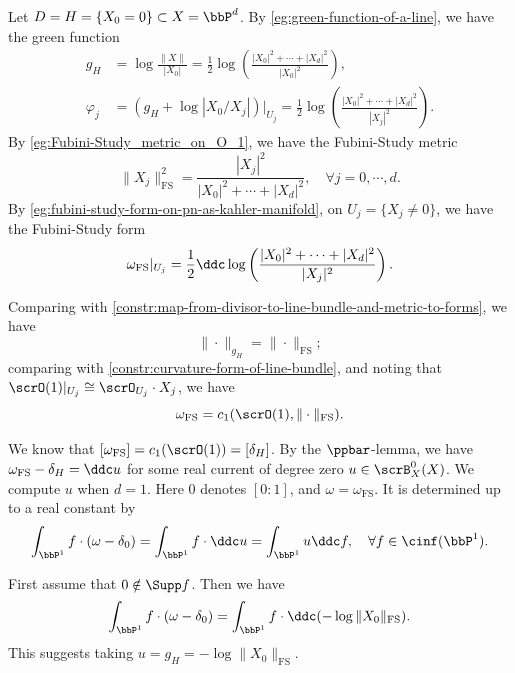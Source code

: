 \begin{example}[label=\labelNFM{eg:green-divisor-and-forms-of-line-in-pn}, status=draft, tag=0000000]
  Let $D = H = \{X_0 = 0\} \subset X = \bbP^d$.
  By \cref{eg:green-function-of-a-line}, we have the green function
  \begin{align*}
    g_H & = \log \frac{\|X\|}{|X_0|} = \frac{1}{2} \log \left( \frac{|X_0|^2 + \cdots + |X_d|^2}{|X_0|^2} \right), \\
    \varphi_j & = (g_H + \log |X_0/X_j|)|_{U_j} = \frac{1}{2} \log \left( \frac{|X_0|^2 + \cdots + |X_d|^2}{|X_j|^2} \right).
  \end{align*}
  By \cref{eg:Fubini-Study_metric_on_O_1}, we have the Fubini-Study metric
  \[ \|X_j\|_{\mathrm{FS}}^2 = \frac{|X_j|^2}{|X_0|^2 + \cdots + |X_d|^2}, \quad \forall j = 0,\cdots,d. \]
  By \cref{eg:fubini-study-form-on-pn-as-kahler-manifold}, on $U_j = \{X_j \neq 0\}$,
  we have the Fubini-Study form
  \[ \omega_{\mathrm{FS}}|_{U_j} = \frac{1}{2} \ddc \log \left(\frac{|X_0|^2 + \cdots + |X_d|^2}{|X_j|^2} \right). \]

  Comparing with \cref{constr:map-from-divisor-to-line-bundle-and-metric-to-forms}, we have
  \[ \|\cdot\|_{g_H} = \|\cdot\|_{\mathrm{FS}}; \]
  comparing with \cref{constr:curvature-form-of-line-bundle},
  and noting that $\scrO(1)|_{U_j} \cong \scrO_{U_j} \cdot X_j$, we have
  \[ \omega_{\mathrm{FS}} = c_1(\scrO(1), \|\cdot\|_{\mathrm{FS}}). \]

  We know that $[\omega_{\mathrm{FS}}] = c_1(\scrO(1)) = [\delta_H]$.
  By the $\ppbar$-lemma, we have $\omega_{\mathrm{FS}} - \delta_H = \ddc u$ for some real current of degree zero $u \in \scrB_X^0(X)$.
  We compute $u$ when $d = 1$.
  Here $0$ denotes $[0:1]$, and $\omega = \omega_{\mathrm{FS}}$.
  It is determined up to a real constant by
  \[ \int_{\bbP^1} f \cdot (\omega - \delta_0) = \int_{\bbP^1} f \cdot \ddc u = \int_{\bbP^1} u \ddc f, \quad \forall f \in \cinf(\bbP^1). \]

  First assume that $0 \notin \Supp f$.
  Then we have
  \[ \int_{\bbP^1} f \cdot (\omega - \delta_0) = \int_{\bbP^1} f \cdot \ddc (- \log \|X_0\|_{\mathrm{FS}}). \]
  This suggests taking $u = g_H = -\log \|X_0\|_{\mathrm{FS}}$.


\end{example}
